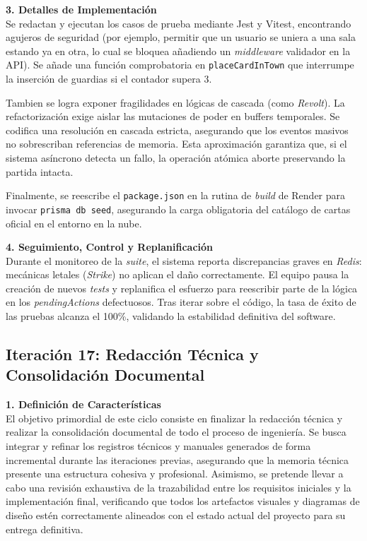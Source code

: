 \textbf{3. Detalles de Implementación} \\
Se redactan y ejecutan los casos de prueba mediante Jest y Vitest, encontrando agujeros de seguridad (por ejemplo, permitir que un usuario se uniera a una sala estando ya en otra, lo cual se bloquea añadiendo un \textit{middleware} validador en la API). Se añade una función comprobatoria en \texttt{placeCardInTown} que interrumpe la inserción de guardias si el contador supera 3. 

Tambien se logra exponer fragilidades en lógicas de cascada (como \textit{Revolt}). La refactorización exige aislar las mutaciones de poder en buffers temporales. Se codifica una resolución en cascada estricta, asegurando que los eventos masivos no sobrescriban referencias de memoria. Esta aproximación garantiza que, si el sistema asíncrono detecta un fallo, la operación atómica aborte preservando la partida intacta.

Finalmente, se reescribe el \texttt{package.json} en la rutina de \textit{build} de Render para invocar \texttt{prisma db seed}, asegurando la carga obligatoria del catálogo de cartas oficial en el entorno en la nube.

\textbf{4. Seguimiento, Control y Replanificación} \\
Durante el monitoreo de la \textit{suite}, el sistema reporta discrepancias graves en \textit{Redis}: mecánicas letales (\textit{Strike}) no aplican el daño correctamente. El equipo pausa la creación de nuevos \textit{tests} y replanifica el esfuerzo para reescribir parte de la lógica en los \textit{pendingActions} defectuosos. Tras iterar sobre el código, la tasa de éxito de las pruebas alcanza el 100\%, validando la estabilidad definitiva del software.

\subsection{Iteración 17: Redacción Técnica y Consolidación Documental}

\textbf{1. Definición de Características} \\
El objetivo primordial de este ciclo consiste en finalizar la redacción técnica y realizar la consolidación documental de todo el proceso de ingeniería. Se busca integrar y refinar los registros técnicos y manuales generados de forma incremental durante las iteraciones previas, asegurando que la memoria técnica presente una estructura cohesiva y profesional. Asimismo, se pretende llevar a cabo una revisión exhaustiva de la trazabilidad entre los requisitos iniciales y la implementación final, verificando que todos los artefactos visuales y diagramas de diseño estén correctamente alineados con el estado actual del proyecto para su entrega definitiva.

